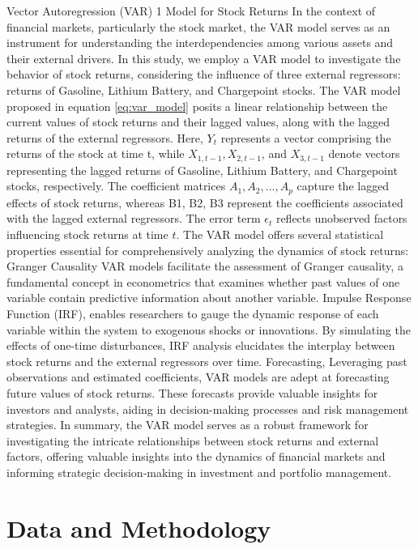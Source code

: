 \documentclass[a4paper,12pt]{article}
\begin{document}
Vector Autoregression (VAR) 1 Model for Stock Returns In the context of financial markets, particularly the stock market, the VAR model serves as an instrument for understanding the interdependencies among various assets and their external drivers. In this study, we employ a VAR model to investigate the behavior of stock returns, considering the influence of three external regressors: returns of Gasoline, Lithium Battery, and Chargepoint stocks. The VAR model proposed in equation \ref{eq:var_model} posits a linear relationship between the current values of stock returns and their lagged values, along with the lagged returns of the external regressors. Here, $Y_t$ represents a vector comprising the returns of the stock at time t, while $X_{1,t-1}, X_{2,t-1}$, and $X_{3,t-1}$ denote vectors representing the lagged returns of Gasoline, Lithium Battery, and Chargepoint stocks, respectively. The coefficient matrices $A_1, A_2, ..., A_p$ capture the lagged effects of stock returns, whereas B1, B2, B3 represent the coefficients associated with the lagged external regressors. The error term $\epsilon_t$ reflects unobserved factors influencing stock returns at time $t$. The VAR model offers several statistical properties essential for comprehensively analyzing the dynamics of stock returns: Granger Causality VAR models facilitate the assessment of Granger causality, a fundamental concept in econometrics that examines whether past values of one variable contain predictive information about another variable. Impulse Response Function (IRF), enables researchers to gauge the dynamic response of each variable within the system to exogenous shocks or innovations. By simulating the effects of one-time disturbances, IRF analysis elucidates the interplay between stock returns and the external regressors over time. Forecasting, Leveraging past observations and estimated coefficients, VAR models are adept at forecasting future values of stock returns. These forecasts provide valuable insights for investors and analysts, aiding in decision-making processes and risk management strategies. In summary, the VAR model serves as a robust framework for investigating the intricate relationships between stock returns and external factors, offering valuable insights into the dynamics of financial markets and informing strategic decision-making in investment and portfolio management.




\section{Data and Methodology}
\end{document}
